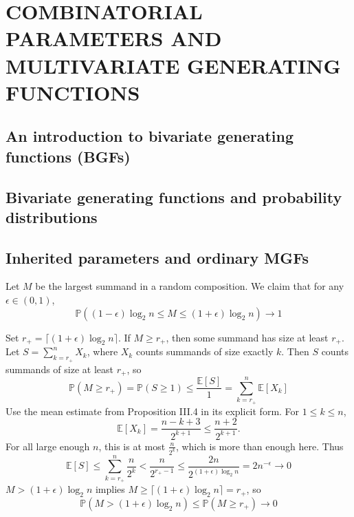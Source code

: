 \chapter{COMBINATORIAL PARAMETERS AND MULTIVARIATE GENERATING FUNCTIONS}
\label{chap:combinatorial parameters and multivariate generating functions}

\section{An introduction to bivariate generating functions (BGFs)}

\section{Bivariate generating functions and probability distributions}

\section{Inherited parameters and ordinary MGFs}

Let $M$ be the largest summand in a random composition. We claim that for any $\epsilon \in (0, 1)$,
\begin{equation*}
    \mathbb{P}\left((1 - \epsilon)\log_{2}n \leq M \leq (1 + \epsilon)\log_{2}n\right) \to 1
\end{equation*}


Set $r_{+} = \lceil(1 + \epsilon)\log_{2}n\rceil$. If $M \geq r_{+}$, then some summand has size at least $r_{+}$.
Let $S = \sum_{k = r_{+}}^{n}X_{k}$, where $X_{k}$ counts summands of size exactly $k$.
Then $S$ counts summands of size at least $r_+$, so
\begin{equation*}
    \mathbb{P}(M \geq r_{+}) = \mathbb{P}(S \geq 1) \leq \frac{\mathbb{E}[S]}{1} = \sum_{k = r_{+}}^{n}\mathbb{E}[X_{k}]
\end{equation*}
Use the mean estimate from Proposition III.4 in its explicit form. For $1 \leq k \leq n$,
\begin{equation*}
    \mathbb{E}[X_k] = \frac{n-k+3}{2^{k+1}} \leq \frac{n+2}{2^{k+1}}.
\end{equation*}
For all large enough $n$, this is at most $\frac{n}{2^k}$, which is more than enough here.
Thus
\begin{equation*}
    \mathbb{E}[S] \leq \sum_{k = r_{+}}^{n} \frac{n}{2^{k}} < \frac{n}{2^{r_{+} - 1}}
        \leq \frac{2n}{2^{(1 + \epsilon)\log_{2}n}} = 2n^{-\epsilon} \to 0
\end{equation*}
$M > (1 + \epsilon)\log_{2}n$ implies $M \geq \lceil (1 + \epsilon)\log_{2}n \rceil = r_{+}$, so
\begin{equation*}
    \mathbb{P}(M > (1 + \epsilon)\log_{2}n) \leq \mathbb{P}(M \geq r_{+}) \to 0
\end{equation*}

